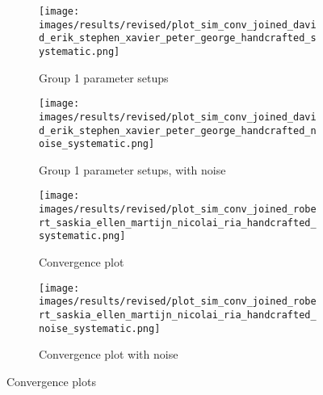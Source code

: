 
\begin{figure}[ht]
	\begin{subfigure}{0.48\linewidth}
	\texttt{[image: images/results/revised/plot\_sim\_conv\_joined\_david\_erik\_stephen\_xavier\_peter\_george\_handcrafted\_systematic.png]}
	\caption{Group 1 parameter setups}
	\label{fig:conv_group1_handcrafted}
	\end{subfigure}
	\hfill
	\begin{subfigure}{0.48\linewidth}
	\texttt{[image: images/results/revised/plot\_sim\_conv\_joined\_david\_erik\_stephen\_xavier\_peter\_george\_handcrafted\_noise\_systematic.png]}
	\caption{Group 1 parameter setups, with noise}
	\label{fig:conv_group1_handcrafted_noise}
	\end{subfigure}
	\begin{subfigure}{0.48\linewidth}
	\texttt{[image: images/results/revised/plot\_sim\_conv\_joined\_robert\_saskia\_ellen\_martijn\_nicolai\_ria\_handcrafted\_systematic.png]}
	\caption{Convergence plot}
	\label{fig:conv_group2_handcrafted}
	\end{subfigure}
	\hfill
	\begin{subfigure}{0.48\linewidth}
	\texttt{[image: images/results/revised/plot\_sim\_conv\_joined\_robert\_saskia\_ellen\_martijn\_nicolai\_ria\_handcrafted\_noise\_systematic.png]}
	\caption{Convergence plot with noise}
	\label{fig:conv_group2_handcrafted_noise}
	\end{subfigure}
	\caption{Convergence plots}
	\label{fig:conv_joined_with_without_placeholder2}
\end{figure}

